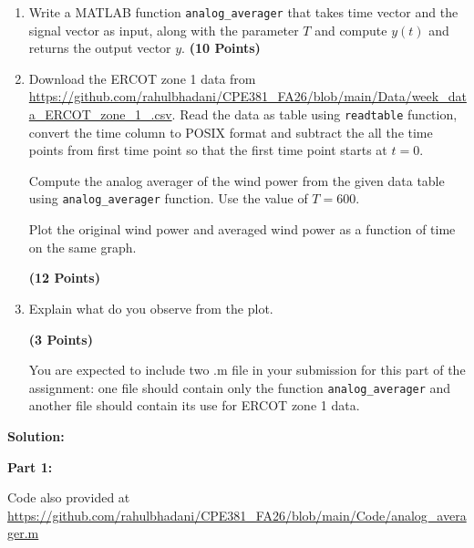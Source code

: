 \documentclass[12pt,xcolor=dvipsnames,svgnames,x11names]{article}
\begin{document}
\begin{enumerate}
\item Write a MATLAB function \texttt{analog\_averager} that takes time vector and the signal vector as input, along with the parameter $T$ and compute $y(t)$ and returns the output vector $y$. \textbf{(10 Points)}

\item Download the ERCOT zone 1 data from \url{https://github.com/rahulbhadani/CPE381_FA26/blob/main/Data/week_data_ERCOT_zone_1_.csv}. Read  the data as table using \texttt{readtable} function, convert the time column to POSIX format and subtract the all the time points from first time point so that the first time point starts at 
$t=0$. 

Compute the analog averager of the wind power from the given data table using \texttt{analog\_averager} function. Use the value of $ T = 600$.

Plot the original wind power and averaged wind power as a function of time on the same graph.

\textbf{(12 Points)}

\item Explain what do you observe from the plot.

\textbf{(3 Points)}

You are expected to include two .m file in your submission for this part of the assignment: one file should contain only the function \texttt{analog\_averager} and another file should contain its use for ERCOT zone 1 data.
\end{enumerate}

\textbf{Solution:}

\textbf{Part 1:}

Code also provided at \url{https://github.com/rahulbhadani/CPE381_FA26/blob/main/Code/analog_averager.m}
\end{document}
